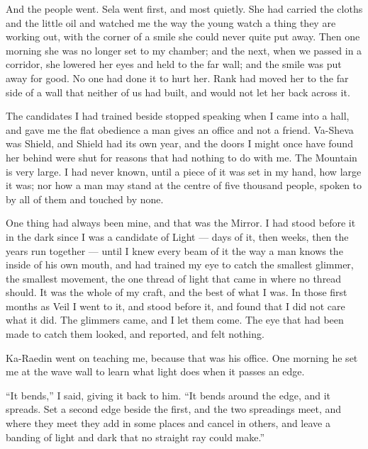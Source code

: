 And the people went. Sela went first, and most quietly. She had carried the cloths and the little oil and watched me the way the young watch a thing they are working out, with the corner of a smile she could never quite put away. Then one morning she was no longer set to my chamber; and the next, when we passed in a corridor, she lowered her eyes and held to the far wall; and the smile was put away for good. No one had done it to hurt her. Rank had moved her to the far side of a wall that neither of us had built, and would not let her back across it.\par

The candidates I had trained beside stopped speaking when I came into a hall, and gave me the flat obedience a man gives an office and not a friend. Va-Sheva was Shield, and Shield had its own year, and the doors I might once have found her behind were shut for reasons that had nothing to do with me. The Mountain is very large. I had never known, until a piece of it was set in my hand, how large it was; nor how a man may stand at the centre of five thousand people, spoken to by all of them and touched by none.\par

One thing had always been mine, and that was the Mirror. I had stood before it in the dark since I was a candidate of Light --- days of it, then weeks, then the years run together --- until I knew every beam of it the way a man knows the inside of his own mouth, and had trained my eye to catch the smallest glimmer, the smallest movement, the one thread of light that came in where no thread should. It was the whole of my craft, and the best of what I was. In those first months as Veil I went to it, and stood before it, and found that I did not care what it did. The glimmers came, and I let them come. The eye that had been made to catch them looked, and reported, and felt nothing.\par

Ka-Raedin went on teaching me, because that was his office. One morning he set me at the wave wall to learn what light does when it passes an edge.\par

``It bends,'' I said, giving it back to him. ``It bends around the edge, and it spreads. Set a second edge beside the first, and the two spreadings meet, and where they meet they add in some places and cancel in others, and leave a banding of light and dark that no straight ray could make.''\par

